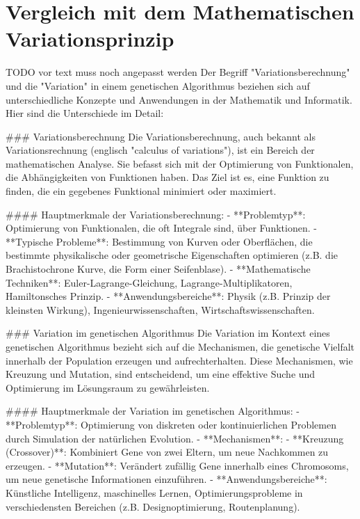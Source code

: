 %
%
%
%
\section{Vergleich mit dem Mathematischen Variationsprinzip
\label{beispiel:section:teil3}}

TODO vor text muss noch angepasst werden
Der Begriff "Variationsberechnung" und die "Variation" in einem genetischen Algorithmus beziehen sich auf unterschiedliche Konzepte und Anwendungen in der Mathematik und Informatik. Hier sind die Unterschiede im Detail:

### Variationsberechnung
Die Variationsberechnung, auch bekannt als Variationsrechnung (englisch "calculus of variations"), ist ein Bereich der mathematischen Analyse. Sie befasst sich mit der Optimierung von Funktionalen, die Abhängigkeiten von Funktionen haben. Das Ziel ist es, eine Funktion zu finden, die ein gegebenes Funktional minimiert oder maximiert.

#### Hauptmerkmale der Variationsberechnung:
- **Problemtyp**: Optimierung von Funktionalen, die oft Integrale sind, über Funktionen.
- **Typische Probleme**: Bestimmung von Kurven oder Oberflächen, die bestimmte physikalische oder geometrische Eigenschaften optimieren (z.B. die Brachistochrone Kurve, die Form einer Seifenblase).
- **Mathematische Techniken**: Euler-Lagrange-Gleichung, Lagrange-Multiplikatoren, Hamiltonsches Prinzip.
- **Anwendungsbereiche**: Physik (z.B. Prinzip der kleinsten Wirkung), Ingenieurwissenschaften, Wirtschaftswissenschaften.

### Variation im genetischen Algorithmus
Die Variation im Kontext eines genetischen Algorithmus bezieht sich auf die Mechanismen, die genetische Vielfalt innerhalb der Population erzeugen und aufrechterhalten. Diese Mechanismen, wie Kreuzung und Mutation, sind entscheidend, um eine effektive Suche und Optimierung im Lösungsraum zu gewährleisten.

#### Hauptmerkmale der Variation im genetischen Algorithmus:
- **Problemtyp**: Optimierung von diskreten oder kontinuierlichen Problemen durch Simulation der natürlichen Evolution.
- **Mechanismen**: 
  - **Kreuzung (Crossover)**: Kombiniert Gene von zwei Eltern, um neue Nachkommen zu erzeugen.
  - **Mutation**: Verändert zufällig Gene innerhalb eines Chromosoms, um neue genetische Informationen einzuführen.
- **Anwendungsbereiche**: Künstliche Intelligenz, maschinelles Lernen, Optimierungsprobleme in verschiedensten Bereichen (z.B. Designoptimierung, Routenplanung).

